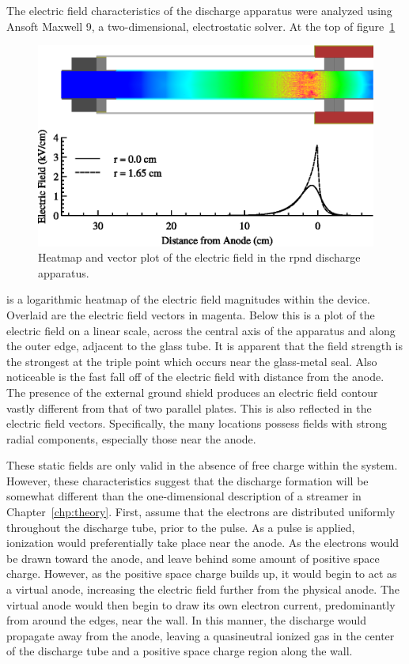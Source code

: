 The electric field characteristics of the discharge apparatus were analyzed
using Ansoft Maxwell 9, a two-dimensional, electrostatic solver. At the top of
figure~\ref{fig:cfields}
\begin{figure}
  \centering
  \includegraphics{./chapters/experiment/figures/cfields.eps}
  \caption{Heatmap and vector plot of the electric field in the \acs{rpnd}
  discharge apparatus.}
  \label{fig:cfields}
\end{figure}
is a logarithmic heatmap of the electric field magnitudes within the device.
Overlaid are the electric field vectors in magenta. Below this is a plot of the
electric field on a linear scale, across the central axis of the apparatus and
along the outer edge, adjacent to the glass tube. It is apparent that the field
strength is the strongest at the triple point which occurs near the glass-metal
seal. Also noticeable is the fast fall off of the electric field with distance
from the anode. The presence of the external ground shield produces an electric
field contour vastly different from that of two parallel plates. This is also
reflected in the electric field vectors. Specifically, the many locations
possess fields with strong radial components, especially those near the anode.

These static fields are only valid in the absence of free charge within the
system. However, these characteristics suggest that the discharge formation will
be somewhat different than the one-dimensional description of a streamer in
Chapter~\ref{chp:theory}. First, assume that the electrons are distributed
uniformly throughout the discharge tube, prior to the pulse. As a pulse is
applied, ionization would preferentially take place near the anode. As the
electrons would be drawn toward the anode, and leave behind some amount of
positive space charge. However, as the positive space charge builds up, it would
begin to act as a virtual anode, increasing the electric field further from the
physical anode. The virtual anode would then begin to draw its own electron
current, predominantly from around the edges, near the wall. In this manner, the
discharge would propagate away from the anode, leaving a quasineutral ionized
gas in the center of the discharge tube and a positive space charge region along
the wall.

